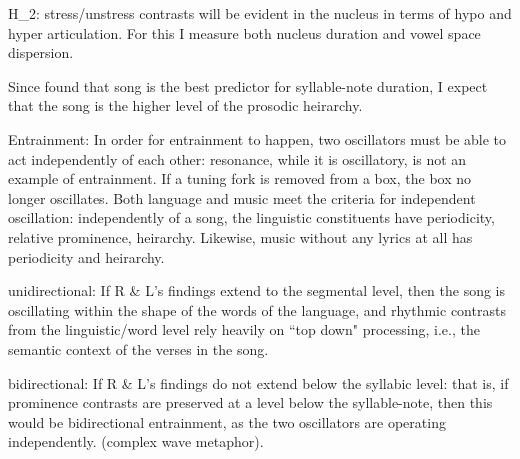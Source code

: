 H_{2}: stress/unstress contrasts will be evident in the nucleus in terms of hypo and hyper articulation. For this I measure both nucleus duration and vowel space dispersion. 


Since \cite{r and l} found that song is the best predictor for syllable-note duration, I expect that the song is the higher level of the prosodic heirarchy. 

Entrainment: 
In order for entrainment to happen, two oscillators must be able to act independently of each other: resonance, while it is oscillatory, is not an example of entrainment. If a tuning fork is removed from a box, the box no longer oscillates. Both language and music meet the criteria for independent oscillation: independently of a song, the linguistic constituents have periodicity, relative prominence, heirarchy. Likewise, music without any lyrics at all has periodicity and heirarchy. 

unidirectional: If R \& L's findings extend to the segmental level, then the song is oscillating within the shape of the words of the language, and rhythmic contrasts from the linguistic/word level rely heavily on ``top down" processing, i.e., the semantic context of the verses in the song. 

bidirectional: If R \& L's findings do not extend below the syllabic level: that is, if prominence contrasts are preserved at a level below the syllable-note, then this would be bidirectional entrainment, as the two oscillators are operating independently. (complex wave metaphor). 

